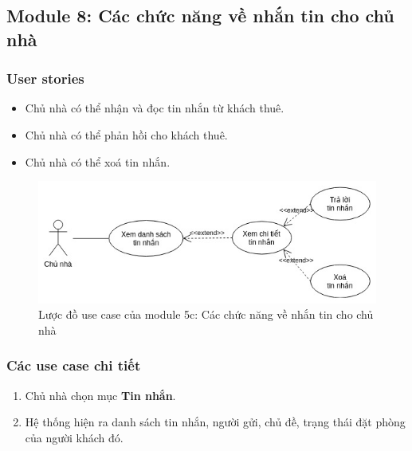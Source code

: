 \subsection{Module 8: Các chức năng về nhắn tin cho chủ nhà}
\subsubsection{User stories}
\begin{itemize}
    \item Chủ nhà có thể nhận và đọc tin nhắn từ khách thuê.
    \item Chủ nhà có thể  phản hồi cho khách thuê.
    \item Chủ nhà có thể xoá tin nhắn.
\end{itemize}


\begin{figure}[!h]
	\centering
	\includegraphics[width=\textwidth]{parts/Cuong/images/module5c.jpg}
	\caption{Lược đồ use case của module 5c: Các chức năng về nhắn tin cho chủ nhà}
\end{figure}

\subsubsection{Các use case chi tiết}
\begin{usecase}
	\normalflow
	\begin{enumerate}
		\item Chủ nhà chọn mục \textbf{Tin nhắn}.
        \item Hệ thống hiện ra danh sách tin nhắn, người gửi, chủ đề, trạng thái đặt phòng của người khách đó.
	\end{enumerate} \\ \hline
	
	\noalternative
	\noexception
\end{usecase}

